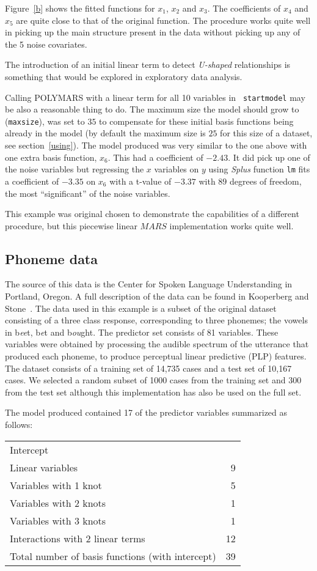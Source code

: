 Figure~\ref{b} shows the fitted functions for $x_1$, $x_2$ and $x_3$. 
The coefficients of $x_4$ and $x_5$ are quite close to that of the
original function. The
procedure works quite well in picking up the main structure present in
the data without picking up any of the 5 noise covariates.

The introduction of an initial linear term to detect {\em U-shaped}
relationships is something
that would be explored in exploratory data analysis. 

Calling POLYMARS with a linear term for all 10 variables in {\tt
startmodel} may be also a reasonable thing to do. The maximum size the
model should grow to ({\tt maxsize}), was set to $35$
to compensate for these initial basis functions being already in the
model 
(by default the maximum
size is $25$ for this size of a dataset, see section~\ref{using}). The model produced was very
similar to the one above with one extra basis function, $x_6$. This had a coefficient of
$-2.43$. It did pick up one of the noise variables but regressing
the $x$ variables on $y$ using {\em Splus} function {\tt lm} fits a
coefficient of $-3.35$ on $x_6$ with a t-value of $-3.37$ with $89$
degrees of freedom, the most ``significant'' of the noise variables.

This example was original chosen to demonstrate the
capabilities of a different procedure, but this piecewise linear
$MARS$ implementation works quite well.

\subsection{Phoneme data}
The source of this data is the Center for Spoken Language
Understanding in Portland, Oregon. A full description of the data can
be found in Kooperberg and Stone~\cite{G}. The data used in this example 
is a subset of the original dataset consisting of a
three class response, corresponding to three phonemes; the vowels in
b{\em ee}t, b{\em e}t and b{\em ou}ght. The predictor set consists of
81 variables.
These variables were obtained by processing the audible spectrum of the
utterance that produced each phoneme, to produce perceptual linear 
predictive (PLP) features. The dataset
consists of a training set of 14,735 cases and a test set of 10,167
cases. We selected a random subset of 1000 cases from the training set and 300
from the test set although this implementation has also be used on the
full set.

\newpage
\noindent
The model produced contained 17 of the predictor variables summarized
as follows:\\
\begin{tabular}{lr}\hline
Intercept              &  \\
Linear variables       & 9\\
Variables with 1 knot  & 5\\
Variables with 2 knots & 1\\
Variables with 3 knots & 1\\
Interactions with 2 linear terms & 12\\\hline
Total number of basis functions (with intercept)& 39 
\end{tabular}

